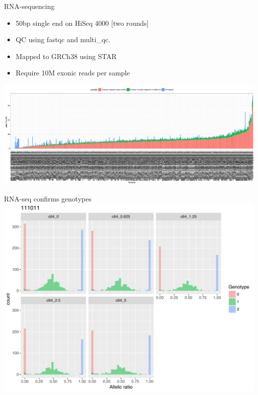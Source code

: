 \documentclass{beamer}
\begin{document}
\begin{frame}{RNA-sequencing}
\begin{itemize}
\item 50bp single end on HiSeq 4000 [two rounds]
\item QC using fastqc and multi\_qc. 
\item Mapped to GRCh38 using STAR
\item Require 10M exonic reads per sample
\end{itemize}
\centering
\includegraphics[width=1\textwidth,clip,trim=0 0 0 0]{../figures/mapped.pdf}
\end{frame}

\begin{frame}{RNA-seq confirms genotypes}
\centering
\includegraphics[width=\textwidth,clip,trim=0 0 0 0]{../figures/confirm_genotypes_rna_single.pdf}
\end{frame}
\end{document}
